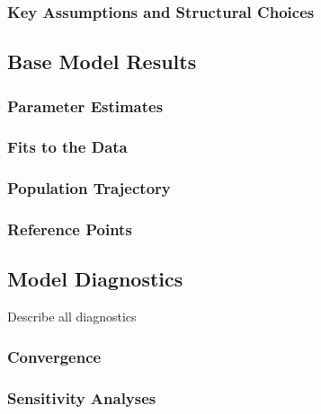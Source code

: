 \documentclass[11pt,
  english,
  letterpaper,
]{article}
\begin{document}
\hypertarget{key-assumptions-and-structural-choices}{%
\subsubsection{Key Assumptions and Structural Choices}\label{key-assumptions-and-structural-choices}}

\hypertarget{base-model-results}{%
\subsection{Base Model Results}\label{base-model-results}}

\hypertarget{parameter-estimates}{%
\subsubsection{Parameter Estimates}\label{parameter-estimates}}

\hypertarget{fits-to-the-data}{%
\subsubsection{Fits to the Data}\label{fits-to-the-data}}

\hypertarget{population-trajectory}{%
\subsubsection{Population Trajectory}\label{population-trajectory}}

\hypertarget{reference-points-1}{%
\subsubsection{Reference Points}\label{reference-points-1}}

\hypertarget{model-diagnostics}{%
\subsection{Model Diagnostics}\label{model-diagnostics}}

Describe all diagnostics

\hypertarget{convergence}{%
\subsubsection{Convergence}\label{convergence}}

\hypertarget{sensitivity-analyses}{%
\subsubsection{Sensitivity Analyses}\label{sensitivity-analyses}}
\end{document}
